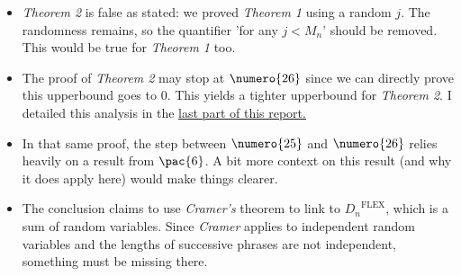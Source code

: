 \begin{itemize}
\item \emph{Theorem 2} is false as stated: we proved \emph{Theorem 1}
      using a random $j$. The randomness remains, so the quantifier
      'for any $j < M_n$' should be removed. This would be true for 
      \emph{Theorem 1} too.

\item The proof of \emph{Theorem 2} may stop at $\numero{26}$
      since we can directly prove this upperbound goes to $0$.
      This yields a tighter upperbound for \emph{Theorem 2}.
      I detailed this analysis in the 
      \hyperlink{upperbound}{last part of this report.}

\item In that same proof, the step between $\numero{25}$ and 
      $\numero{26}$ relies heavily on a result from $\pac{6}$.
      A bit more context on this result (and why it does apply here)
      would make things clearer.

\item The conclusion claims to use \emph{Cramer's} theorem to link
      to ${D_n}^{\text{FLEX}}$, which is a sum of random variables.
      Since \emph{Cramer} applies to independent random variables and the 
      lengths of successive phrases are not independent, something must be missing 
      there.
      
\end{itemize}